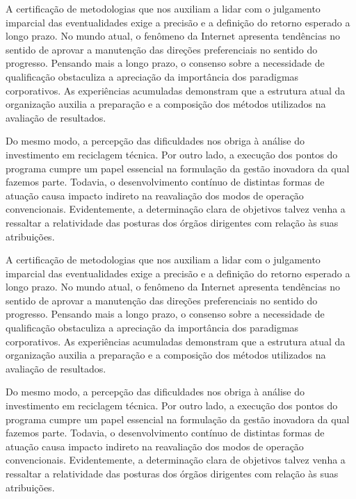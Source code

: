 \documentclass[a4paper,12pt]{udesc}
\begin{document}
          A certificação de metodologias que nos auxiliam a lidar com o julgamento imparcial das eventualidades exige a precisão e a definição do retorno esperado a longo prazo. No mundo atual, o fenômeno da Internet apresenta tendências no sentido de aprovar a manutenção das direções preferenciais no sentido do progresso. Pensando mais a longo prazo, o consenso sobre a necessidade de qualificação obstaculiza a apreciação da importância dos paradigmas corporativos. As experiências acumuladas demonstram que a estrutura atual da organização auxilia a preparação e a composição dos métodos utilizados na avaliação de resultados.



          Do mesmo modo, a percepção das dificuldades nos obriga à análise do investimento em reciclagem técnica. Por outro lado, a execução dos pontos do programa cumpre um papel essencial na formulação da gestão inovadora da qual fazemos parte. Todavia, o desenvolvimento contínuo de distintas formas de atuação causa impacto indireto na reavaliação dos modos de operação convencionais. Evidentemente, a determinação clara de objetivos talvez venha a ressaltar a relatividade das posturas dos órgãos dirigentes com relação às suas atribuições.




          A certificação de metodologias que nos auxiliam a lidar com o julgamento imparcial das eventualidades exige a precisão e a definição do retorno esperado a longo prazo. No mundo atual, o fenômeno da Internet apresenta tendências no sentido de aprovar a manutenção das direções preferenciais no sentido do progresso. Pensando mais a longo prazo, o consenso sobre a necessidade de qualificação obstaculiza a apreciação da importância dos paradigmas corporativos. As experiências acumuladas demonstram que a estrutura atual da organização auxilia a preparação e a composição dos métodos utilizados na avaliação de resultados.



          Do mesmo modo, a percepção das dificuldades nos obriga à análise do investimento em reciclagem técnica. Por outro lado, a execução dos pontos do programa cumpre um papel essencial na formulação da gestão inovadora da qual fazemos parte. Todavia, o desenvolvimento contínuo de distintas formas de atuação causa impacto indireto na reavaliação dos modos de operação convencionais. Evidentemente, a determinação clara de objetivos talvez venha a ressaltar a relatividade das posturas dos órgãos dirigentes com relação às suas atribuições.
\end{document}
